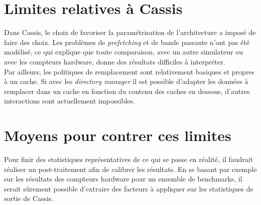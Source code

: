 \section{Limites relatives à \textsf{Cassis}}
Dans \textsf{Cassis}, le choix de favoriser la paramétrisation de l'architecture a imposé de faire des choix. Les problèmes de \emph{prefetching} et de bande passante n'ont pas été modélisé, ce qui explique que toute comparaison, avec un autre simulateur ou avec les compteurs hardware, donne des résultats difficiles à interpréter. \\

Par ailleurs, les politiques de remplacement sont relativement basiques et propres à un cache. Si avec les \emph{directory manager} il est possible d'adapter les données à remplacer dans un cache en fonction du contenu des caches en dessous, d'autres interactions sont actuellement impossibles.

\section{Moyens pour contrer ces limites}
Pour finir des statistiques représentatives de ce qui se passe en réalité, il faudrait réaliser un post-traitement afin de calibrer les résultats. En se basant par exemple sur les résultats des compteurs hardware pour un ensemble de benchmarks, il serait sûrement possible d'extraire des facteurs à appliquer sur les statistiques de sortie de \textsf{Cassis}.
